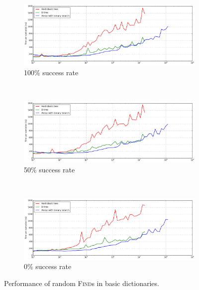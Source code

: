 \begin{figure}
\begin{subfigure}[t]{\textwidth}
	\includegraphics[width=\textwidth]{img/performance/basic-random-find-100}
	\caption{100\% success rate}
\end{subfigure}
\\
\begin{subfigure}[t]{\textwidth}
	\includegraphics[width=\textwidth]{img/performance/basic-random-find-50}
	\caption{50\% success rate}
\end{subfigure}
\\
\begin{subfigure}[t]{\textwidth}
	\includegraphics[width=\textwidth]{img/performance/basic-random-find-0}
	\caption{0\% success rate}
\end{subfigure}
\caption{Performance of random \textsc{Find}s in basic dictionaries.}
\label{fig:basic-finds}
\end{figure}

